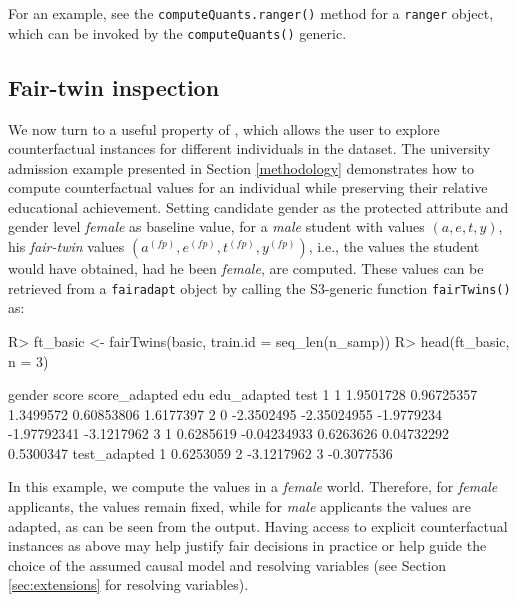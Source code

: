\documentclass[
  nojss]{jss}
\begin{document}
For an example, see the \texttt{computeQuants.ranger()} method for a
\texttt{ranger} object, which can be invoked by the
\texttt{computeQuants()} generic.

\hypertarget{fair-twin-inspection}{%
\subsection{Fair-twin inspection}\label{fair-twin-inspection}}

We now turn to a useful property of , which allows the
user to explore counterfactual instances for different individuals in
the dataset. The university admission example presented in Section
\ref{methodology} demonstrates how to compute counterfactual values for
an individual while preserving their relative educational achievement.
Setting candidate gender as the protected attribute and gender level
\emph{female} as baseline value, for a \emph{male} student with values
\((a, e, t, y)\), his \emph{fair-twin} values
\(( {a}^{(fp)},  {e}^{(fp)},  {t}^{(fp)},  {y}^{(fp)})\), i.e., the
values the student would have obtained, had he been \emph{female}, are
computed. These values can be retrieved from a \texttt{fairadapt} object
by calling the S3-generic function \texttt{fairTwins()} as:

\begin{CodeChunk}
\begin{CodeInput}
R> ft_basic <- fairTwins(basic, train.id = seq_len(n_samp))
R> head(ft_basic, n = 3)
\end{CodeInput}
\begin{CodeOutput}
  gender      score score_adapted        edu edu_adapted       test
1      1  1.9501728    0.96725357  1.3499572  0.60853806  1.6177397
2      0 -2.3502495   -2.35024955 -1.9779234 -1.97792341 -3.1217962
3      1  0.6285619   -0.04234933  0.6263626  0.04732292  0.5300347
  test_adapted
1    0.6253059
2   -3.1217962
3   -0.3077536
\end{CodeOutput}
\end{CodeChunk}

In this example, we compute the values in a \emph{female} world.
Therefore, for \emph{female} applicants, the values remain fixed, while
for \emph{male} applicants the values are adapted, as can be seen from
the output. Having access to explicit counterfactual instances as above
may help justify fair decisions in practice or help guide the choice of
the assumed causal model and resolving variables (see Section
\ref{sec:extensions} for resolving variables).
\end{document}
